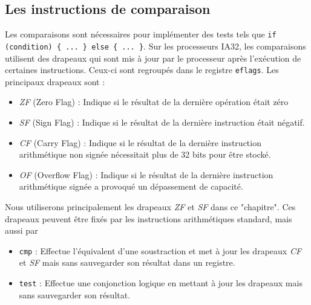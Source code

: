 \subsection{Les instructions de comparaison}
Les comparaisons sont nécessaires pour implémenter des tests tels que \texttt{if (condition) \{ ... \} else \{ ... \}}.
Sur les processeurs IA32, les comparaisons utilisent des drapeaux qui sont mis à jour par le processeur après l'exécution de certaines instructions.
Ceux-ci sont regroupés dans le registre \texttt{eflags}.
Les principaux drapeaux sont :
\begin{itemize}
  \item \emph{ZF} (Zero Flag) : Indique si le résultat de la dernière opération était zéro
  \item \emph{SF} (Sign Flag) : Indique si le résultat de la dernière instruction était négatif.
  \item \emph{CF} (Carry Flag) : Indique si le résultat de la dernière instruction arithmétique non signée nécessitait plus de 32 bits pour être stocké.
  \item \emph{OF} (Overflow Flag) : Indique si le résultat de la dernière instruction arithmétique signée a provoqué un dépassement de capacité.
\end{itemize}

Nous utiliserons principalement les drapeaux \textit{ZF} et \textit{SF} dans ce "chapitre".
Ces drapeaux peuvent être fixés par les instructions arithmétiques standard, mais aussi par
\begin{itemize}
  \item \texttt{cmp} : Effectue l'équivalent d'une soustraction et met à jour les drapeaux \textit{CF} et \textit{SF} mais sans sauvegarder son résultat dans un registre.
  \item \texttt{test} : Effectue une conjonction logique en mettant à jour les drapeaux mais sans sauvegarder son résultat.
\end{itemize}

